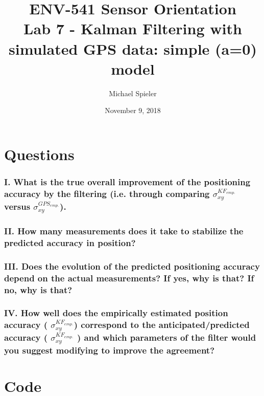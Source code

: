 \documentclass{article}
\title{ENV-541 Sensor Orientation\\Lab 7 - Kalman Filtering with simulated GPS data: simple (a=0) model}
\author{Michael Spieler}
\date{November 9, 2018}
\begin{document}
\maketitle

\section*{Questions}

\subsubsection*{I. What is the true overall improvement of the positioning accuracy by the filtering
(i.e. through comparing $\sigma_{xy}^{KF_{emp.}}$ versus $\sigma_{xy}^{GPS_{emp.}}$).}

\subsubsection*{II. How many measurements does it take to stabilize the predicted accuracy in position?}

\subsubsection*{III. Does the evolution of the predicted positioning accuracy depend on the actual measurements?
If yes, why is that? If no, why is that?}

\subsubsection*{IV. How well does the empirically estimated position accuracy ( $\sigma_{xy}^{KF_{emp.}}$)
correspond to the anticipated/predicted accuracy ( $\sigma_{xy}^{KF_{emp.}}$ ) and which parameters
of the filter would you suggest modifying to improve the agreement?}

\newpage
\section*{Code}

\end{document}
